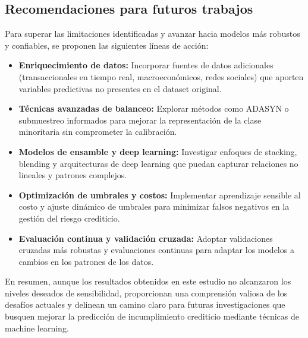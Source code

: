 \documentclass[journal]{apa7}
\begin{document}
\subsection{Recomendaciones para futuros trabajos}

Para superar las limitaciones identificadas y avanzar hacia modelos más robustos y confiables, se proponen las siguientes líneas de acción:
\begin{itemize}
  \item \textbf{Enriquecimiento de datos:} Incorporar fuentes de datos adicionales (transaccionales en tiempo real, macroeconómicos, redes sociales) que aporten variables predictivas no presentes en el dataset original.
  \item \textbf{Técnicas avanzadas de balanceo:} Explorar métodos como ADASYN o submuestreo informados para mejorar la representación de la clase minoritaria sin comprometer la calibración.
  \item \textbf{Modelos de ensamble y deep learning:} Investigar enfoques de stacking, blending y arquitecturas de deep learning que puedan capturar relaciones no lineales y patrones complejos.
  \item \textbf{Optimización de umbrales y costos:} Implementar aprendizaje sensible al costo y ajuste dinámico de umbrales para minimizar falsos negativos en la gestión del riesgo crediticio.
  \item \textbf{Evaluación continua y validación cruzada:} Adoptar validaciones cruzadas más robustas y evaluaciones continuas para adaptar los modelos a cambios en los patrones de los datos.
\end{itemize}

En resumen, aunque los resultados obtenidos en este estudio no alcanzaron los niveles deseados de sensibilidad, proporcionan una comprensión valiosa de los desafíos actuales y delinean un camino claro para futuras investigaciones que busquen mejorar la predicción de incumplimiento crediticio mediante técnicas de machine learning.
\end{document}
